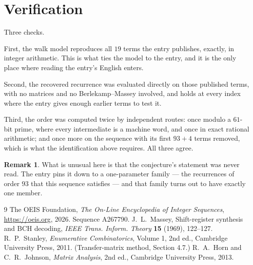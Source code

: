 \documentclass[11pt,a4paper]{article}
\theoremstyle{plain}
\theoremstyle{definition}
\newtheorem{remark}[theorem]{Remark}
\begin{document}
\section{Verification}

Three checks.

First, the walk model reproduces all $19$ terms the entry publishes, exactly, in integer
arithmetic. This is what ties the model to the entry, and it is the only place where reading
the entry's English enters.

Second, the recovered recurrence was evaluated directly on those published terms, with no
matrices and no Berlekamp--Massey involved, and holds at every index where the entry gives
enough earlier terms to test it.

Third, the order was computed twice by independent routes: once modulo a $61$-bit prime, where
every intermediate is a machine word, and once in exact rational arithmetic; and once more on
the sequence with its first $93+4$ terms removed, which is what the identification above
requires. All three agree.

\begin{remark}
What is unusual here is that the conjecture's statement was never read. The entry pins it down
to a one-parameter family --- the recurrences of order $93$ that this sequence satisfies
--- and that family turns out to have exactly one member.
\end{remark}

\begin{thebibliography}{9}
 The OEIS Foundation, \emph{The On-Line Encyclopedia of Integer
Sequences}, \url{https://oeis.org}, 2026. Sequence A267790.
 J.~L.~Massey, Shift-register synthesis and BCH decoding, \emph{IEEE
Trans. Inform. Theory} \textbf{15} (1969), 122--127.
 R.~P.~Stanley, \emph{Enumerative Combinatorics}, Volume 1, 2nd ed.,
Cambridge University Press, 2011. (Transfer-matrix method, Section 4.7.)
 R.~A.~Horn and C.~R.~Johnson, \emph{Matrix Analysis}, 2nd ed., Cambridge
University Press, 2013.
\end{thebibliography}
\end{document}
